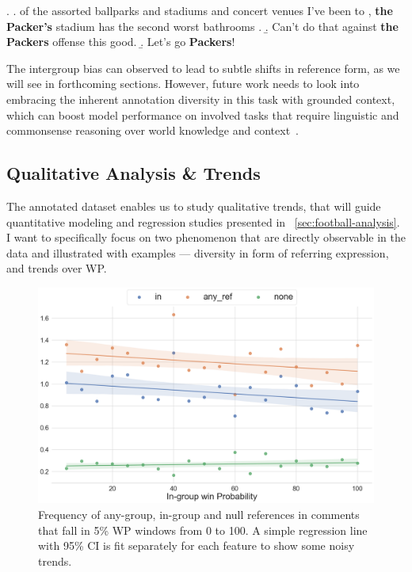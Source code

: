 \ex. \label{ex:disagree-alt} \a. \textellipsis of the assorted ballparks and stadiums and concert venues I've been to , \textbf{the Packer's} stadium has the second worst bathrooms .
    \b. Can’t do that against \textbf{the Packers} offense this good.
    \b. Let's go \textbf{Packers}!

The intergroup bias can observed to lead to subtle shifts in reference form, as we will see in forthcoming sections. However, future work needs to look into embracing the inherent annotation diversity in this task with grounded context, which can boost model performance on involved tasks that require linguistic and commonsense reasoning over world knowledge and context~\citep{atwell-etal-2022-role}.

\subsection{Qualitative Analysis \& Trends}
\label{subsec:football-trends}

The annotated dataset enables us to study qualitative trends, that will guide quantitative modeling and regression studies presented in \textsection~\ref{sec:football-analysis}. I want to specifically focus on two phenomenon that are directly observable in the data and illustrated with examples --- diversity in form of referring expression, and trends over WP.

\begin{figure}[t]
    \centering
    \includegraphics[width=\linewidth]{figures/test-trends.png}
    \caption{Frequency of any-group, in-group and null references in comments that fall in 5\% WP windows from 0 to 100. A simple regression line with 95\% CI is fit separately for each feature to show some noisy trends.}
    \label{fig:test-trends}
\end{figure}

